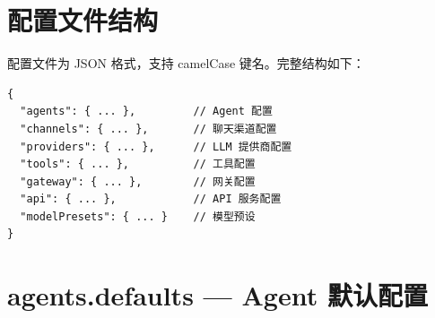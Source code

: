 \documentclass[12pt,a4paper,UTF8]{ctexart}
\begin{document}
\section{配置文件结构}

配置文件为 JSON 格式，支持 camelCase 键名。完整结构如下：

\begin{verbatim}
{
  "agents": { ... },         // Agent 配置
  "channels": { ... },       // 聊天渠道配置
  "providers": { ... },      // LLM 提供商配置
  "tools": { ... },          // 工具配置
  "gateway": { ... },        // 网关配置
  "api": { ... },            // API 服务配置
  "modelPresets": { ... }    // 模型预设
}
\end{verbatim}

\section{agents.defaults — Agent 默认配置}
\end{document}
